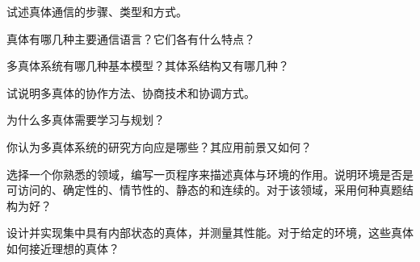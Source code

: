 \begin{question}
试述真体通信的步骤、类型和方式。
\end{question}
\begin{solution}
\end{solution}

\begin{question}
真体有哪几种主要通信语言？它们各有什么特点？
\end{question}
\begin{solution}
\end{solution}

\begin{question}
多真体系统有哪几种基本模型？其体系结构又有哪几种？ 
\end{question}
\begin{solution}
\end{solution}

\begin{question}
试说明多真体的协作方法、协商技术和协调方式。
\end{question}
\begin{solution}
\end{solution}

\begin{question}
为什么多真体需要学习与规划？
\end{question}
\begin{solution}
\end{solution}

\begin{question}你认为多真体系统的研究方向应是哪些？其应用前景又如何？
\end{question}
\begin{solution}
\end{solution}

\begin{question}
选择一个你熟悉的领域，编写一页程序来描述真体与环境的作用。说明环境是否是可访问的、确定性的、情节性的、静态的和连续的。对于该领域，采用何种真题结构为好？
\end{question}
\begin{solution}
\end{solution}

\begin{question}
设计并实现集中具有内部状态的真体，并测量其性能。对于给定的环境，这些真体如何接近理想的真体？
\end{question}
\begin{solution}
\end{solution}

